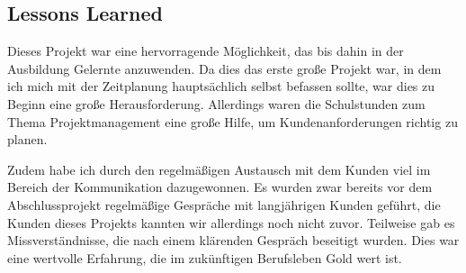 \subsection{Lessons Learned}
\label{sec:LessonsLearned}

Dieses Projekt war eine hervorragende Möglichkeit, das bis dahin in der Ausbildung Gelernte anzuwenden.
Da dies das erste große Projekt war, in dem ich mich mit der Zeitplanung hauptsächlich selbst befassen sollte, war dies zu Beginn eine große Herausforderung.
Allerdings waren die Schulstunden zum Thema Projektmanagement eine große Hilfe, um Kundenanforderungen richtig zu planen.

Zudem habe ich durch den regelmäßigen Austausch mit dem Kunden viel im Bereich der Kommunikation dazugewonnen.
Es wurden zwar bereits vor dem Abschlussprojekt regelmäßige Gespräche mit langjährigen Kunden geführt, die Kunden dieses Projekts kannten wir allerdings noch nicht zuvor.
Teilweise gab es Missverständnisse, die nach einem klärenden Gespräch beseitigt wurden.
Dies war eine wertvolle Erfahrung, die im zukünftigen Berufsleben Gold wert ist.
